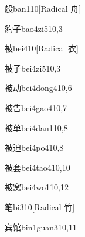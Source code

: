 \begin{verbete}{般}{ban1}{10}[Radical 舟]
\end{verbete}

\begin{verbete}{豹子}{bao4zi5}{10,3}
\end{verbete}

\begin{verbete}{被}{bei4}{10}[Radical 衣]
\end{verbete}

\begin{verbete}{被子}{bei4zi5}{10,3}
\end{verbete}

\begin{verbete}{被动}{bei4dong4}{10,6}
\end{verbete}

\begin{verbete}{被告}{bei4gao4}{10,7}
\end{verbete}

\begin{verbete}{被单}{bei4dan1}{10,8}
\end{verbete}

\begin{verbete}{被迫}{bei4po4}{10,8}
\end{verbete}

\begin{verbete}{被套}{bei4tao4}{10,10}
\end{verbete}

\begin{verbete}{被窝}{bei4wo1}{10,12}
\end{verbete}

\begin{verbete}{笔}{bi3}{10}[Radical 竹]
\end{verbete}

\begin{verbete}{宾馆}{bin1guan3}{10,11}
\end{verbete}

